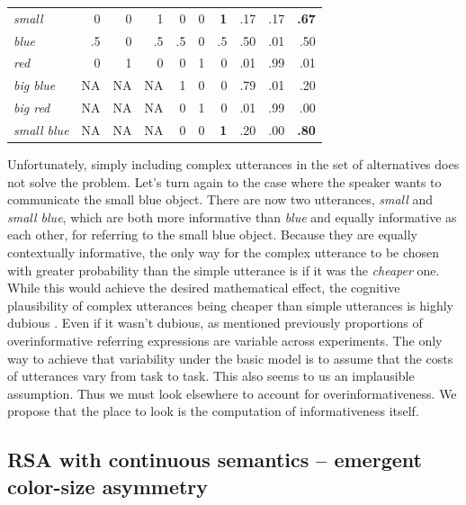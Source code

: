 \documentclass[11pt]{article}
\begin{document}
\begin{table}
\begin{tabular}{l r r r r r r r r r}
\emph{small} & 0 & 0 & 1 & 0 & 0 & \textbf{1} & .17 & .17 & \textbf{.67} \\
\emph{blue} & .5 & 0 & .5 & .5 & 0 & .5 & .50 & .01 & .50 \\
\emph{red} & 0 & 1 & 0 & 0 & 1 & 0 & .01 & .99 & .01 \\
\emph{big blue} & NA & NA & NA & 1 & 0 & 0 & .79 & .01 & .20 \\
\emph{big red} & NA & NA & NA & 0 & 1 & 0 & .01 & .99 & .00 \\
\emph{small blue} & NA & NA & NA & 0 & 0 & \textbf{1} & .20 & .00 & \textbf{.80} \\
\bottomrule
\end{tabular}
\label{tab:detliteral}
\end{table}

Unfortunately, simply including complex utterances in the set of alternatives does not solve the problem. Let's turn again to the case where the speaker wants to communicate the small blue object. There are now two  utterances, \emph{small} and \emph{small blue}, which are both more informative than \emph{blue} and equally informative as each other, for referring to the small blue object. Because they are equally contextually informative, the only way for the complex utterance to be chosen with greater probability than the simple utterance is if it was the \emph{cheaper} one. While this would achieve the desired mathematical effect, the cognitive plausibility of complex utterances being cheaper than simple utterances is highly dubious \cite<see also the discussion of cost functions in>[who explicitly introduce this monotonicity constraint as a constraint on the search space of possible referring expressions within a graph-based framework]{Krahmer2003}. Even if it wasn't dubious, as  mentioned previously proportions of overinformative referring expressions are variable across experiments. The only way to achieve that variability under the basic model is to assume that the costs of utterances vary from task to task. This also seems to us an implausible assumption. Thus we must look elsewhere to account for overinformativeness. We propose that the place to look is the computation of informativeness itself. 



\subsection{RSA with continuous semantics -- emergent color-size asymmetry}
\label{sec:modifiedmodel}
\end{document}
